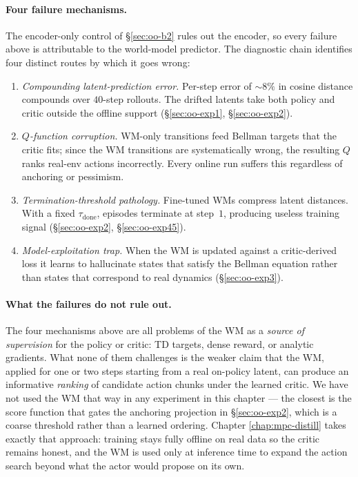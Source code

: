 \paragraph{Four failure mechanisms.} The encoder-only control of \S\ref{sec:oo-b2} rules out the encoder, so every failure above is attributable to the world-model predictor. The diagnostic chain identifies four distinct routes by which it goes wrong:
\begin{enumerate}
    \item \emph{Compounding latent-prediction error.}
      Per-step error of $\sim 8\%$ in cosine distance compounds over $40$-step rollouts. The drifted latents take both policy and critic outside the offline support
      (\S\ref{sec:oo-exp1}, \S\ref{sec:oo-exp2}).
    \item \emph{$Q$-function corruption.}
      WM-only transitions feed Bellman targets that the critic fits;
      since the WM transitions are systematically wrong, the resulting
      $Q$ ranks real-env actions incorrectly. Every online run suffers
      this regardless of anchoring or pessimism.
    \item \emph{Termination-threshold pathology.}
      Fine-tuned WMs compress latent distances. With a fixed
      $\tau_{\text{done}}$, episodes terminate at step~$1$, producing
      useless training signal (\S\ref{sec:oo-exp2}, \S\ref{sec:oo-exp45}).
    \item \emph{Model-exploitation trap.}
      When the WM is updated against a critic-derived loss it learns to
      hallucinate states that satisfy the Bellman equation rather than
      states that correspond to real dynamics (\S\ref{sec:oo-exp3}).
\end{enumerate}

\paragraph{What the failures do not rule out.} The four mechanisms above are all problems of the WM as a \emph{source of supervision} for the policy or critic: TD targets, dense reward, or analytic gradients. What none of them challenges is the weaker claim that the WM, applied for one or two steps starting from a real on-policy latent, can produce an informative \emph{ranking} of candidate action chunks under the learned critic. We have not used the WM that way in any experiment in this chapter --- the closest is the score function that gates the anchoring projection in \S\ref{sec:oo-exp2}, which is a coarse threshold rather than a learned ordering. Chapter \ref{chap:mpc-distill} takes exactly that approach: training stays fully offline on real data so the critic remains honest, and the WM is used only at inference time to expand the action search beyond what the actor would propose on its own.
